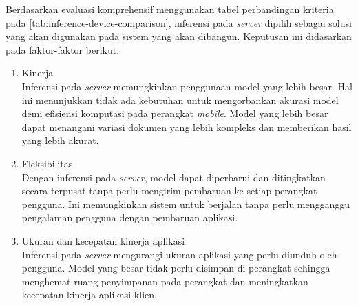 Berdasarkan evaluasi komprehensif menggunakan tabel perbandingan kriteria pada \autoref{tab:inference-device-comparison}, inferensi pada \emph{server} dipilih sebagai solusi yang akan digunakan pada sistem yang akan dibangun. Keputusan ini didasarkan pada faktor-faktor berikut.
\begin{enumerate}
    \item Kinerja ~\\
    Inferensi pada \emph{server} memungkinkan penggunaan model yang lebih besar. Hal ini menunjukkan tidak ada kebutuhan untuk mengorbankan akurasi model demi efisiensi komputasi pada perangkat \emph{mobile}. Model yang lebih besar dapat menangani variasi dokumen yang lebih kompleks dan memberikan hasil yang lebih akurat.
    \item Fleksibilitas ~\\
    Dengan inferensi pada \emph{server}, model dapat diperbarui dan ditingkatkan secara terpusat tanpa perlu mengirim pembaruan ke setiap perangkat pengguna. Ini memungkinkan sistem untuk berjalan tanpa perlu mengganggu pengalaman pengguna dengan pembaruan aplikasi.
    \item Ukuran dan kecepatan kinerja aplikasi ~\\
    Inferensi pada \emph{server} mengurangi ukuran aplikasi yang perlu diunduh oleh pengguna. Model yang besar tidak perlu disimpan di perangkat sehingga menghemat ruang penyimpanan pada perangkat dan meningkatkan kecepatan kinerja aplikasi klien.
\end{enumerate}

